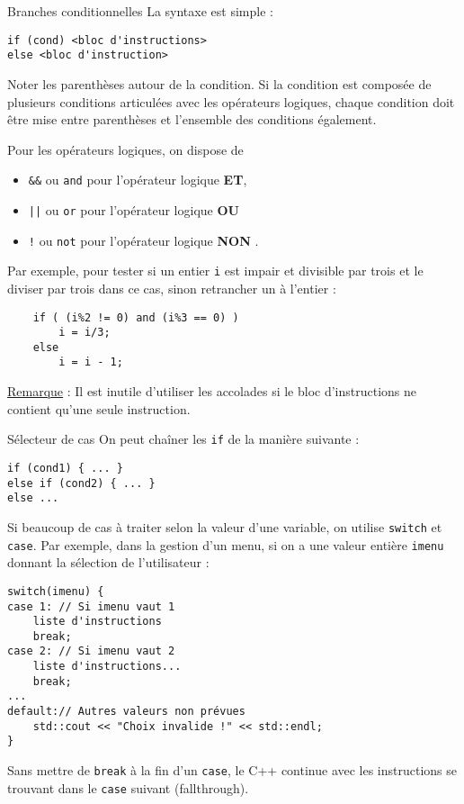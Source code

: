 \documentclass[compress,10pt,aspectratio=169]{beamer}
\begin{document}
\begin{frame}[fragile]{Branches conditionnelles}
    \scriptsize
    La syntaxe est simple :
    \begin{verbatim}
if (cond) <bloc d'instructions>
else <bloc d'instruction>
    \end{verbatim}

    Noter les parenthèses autour de la condition. Si la condition est composée de plusieurs conditions articulées avec les opérateurs
    logiques, chaque condition doit être mise entre parenthèses et l'ensemble des conditions également.

    Pour les opérateurs logiques, on dispose de 
    \begin{itemize}
    \item \texttt{\&\&} ou \texttt{and} pour l'opérateur logique \textbf{ET},
    \item \texttt{||} ou \texttt{or} pour l'opérateur logique \textbf{OU} 
    \item \texttt{!} ou \texttt{not} pour l'opérateur logique \textbf{NON}  .
    \end{itemize}

    Par exemple, pour tester si un entier \texttt{i} est impair et divisible par trois et le diviser par trois dans ce cas, sinon
    retrancher un à l'entier :
    \begin{verbatim}
    if ( (i%2 != 0) and (i%3 == 0) )
        i = i/3;
    else
        i = i - 1;
    \end{verbatim}

    \underline{Remarque} : Il est inutile d'utiliser les accolades si le bloc d'instructions ne contient qu'une seule instruction.

\end{frame}

\begin{frame}[fragile]{Sélecteur de cas}
    \scriptsize
    On peut chaîner les \texttt{if} de la manière suivante :
    \begin{verbatim}
if (cond1) { ... }
else if (cond2) { ... }
else ...
    \end{verbatim}
    Si beaucoup de cas à traiter selon la valeur d'une variable, on utilise \texttt{switch} et \texttt{case}.
    Par exemple, dans la gestion d'un menu, si on a une valeur entière \texttt{imenu} donnant la sélection de l'utilisateur :
    \begin{verbatim}
switch(imenu) {
case 1: // Si imenu vaut 1
    liste d'instructions
    break;
case 2: // Si imenu vaut 2
    liste d'instructions...
    break;
... 
default:// Autres valeurs non prévues
    std::cout << "Choix invalide !" << std::endl;
}
\end{verbatim}
\vspace*{-2mm}
Sans mettre de \texttt{break} à la fin d'un \texttt{case}, le C++ continue avec les instructions
se trouvant dans le \texttt{case} suivant (fallthrough).
\end{frame}
\end{document}
